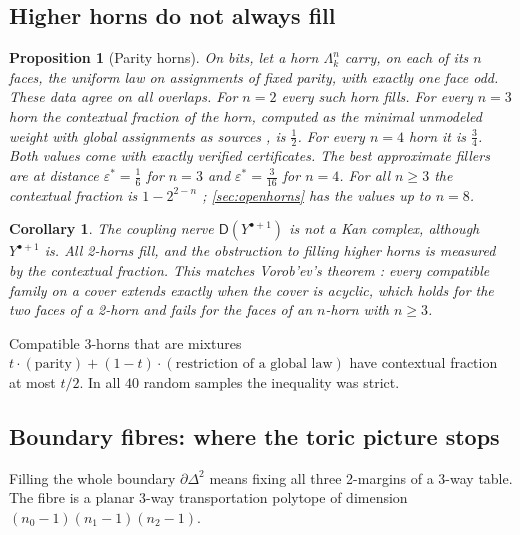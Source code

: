 \documentclass[11pt]{article}
\newtheorem{proposition}[theorem]{Proposition}
\newtheorem{corollary}[theorem]{Corollary}
\theoremstyle{definition}
\theoremstyle{remark}
\newcommand{\D}{\mathsf{D}}
\begin{document}
\subsection{Higher horns do not always fill}

\begin{proposition}[Parity horns]\label{prop:parity}
On bits, let a horn $\Lambda^n_k$ carry, on each of its $n$ faces, the uniform law on assignments of fixed parity, with
exactly one face odd. These data agree on all overlaps. For $n=2$ every such horn fills. For every $n=3$ horn
the contextual fraction of the horn, computed as the minimal unmodeled weight with global assignments as
sources \cite[Thm.~7.12]{Attribution}, is $\tfrac12$. For every $n=4$ horn it is $\tfrac34$. Both values come with exactly
verified certificates. The best approximate fillers are at distance $\varepsilon^*=\tfrac16$ for $n=3$ and
$\varepsilon^*=\tfrac3{16}$ for $n=4$. For all $n\ge3$ the contextual fraction is $1-2^{2-n}$ \cite[Thm.~4.3]{Conditionals}; \cref{sec:openhorns} has the
values up to $n=8$.
\end{proposition}

\begin{corollary}\label{cor:notkan}
The coupling nerve $\D(Y^{\bullet+1})$ is not a Kan complex, although $Y^{\bullet+1}$ is. All 2-horns fill, and the
obstruction to filling higher horns is measured by the contextual fraction. This matches Vorob'ev's theorem
\cite{Vorobev1962}: every compatible family on a cover extends exactly when the cover is acyclic, which holds for
the two faces of a 2-horn and fails for the faces of an $n$-horn with $n\ge3$.
\end{corollary}

Compatible 3-horns that are mixtures $t\cdot(\text{parity})+(1-t)\cdot(\text{restriction of a global law})$ have contextual
fraction at most $t/2$. In all $40$ random samples the inequality was strict.

\subsection{Boundary fibres: where the toric picture stops}

Filling the whole boundary $\partial\Delta^2$ means fixing all three 2-margins of a 3-way table. The fibre is a planar
3-way transportation polytope of dimension $(n_0-1)(n_1-1)(n_2-1)$.
\end{document}
